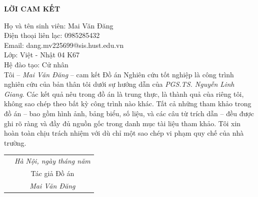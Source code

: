 \documentclass[../DoAn.tex]{subfiles}
\begin{document}
    \hfill
    \begin{center}
        \LARGE\textbf{LỜI CAM KẾT}\\
    \end{center}
    \vspace{1cm}
    Họ và tên sinh viên: Mai Văn Đăng\\ Điện thoại liên lạc: 0985285432\\ Email:
    dang.mv225699@sis.hust.edu.vn\\ Lớp: Việt - Nhật 04 K67\\ Hệ đào tạo: Cử nhân
    \\

    \vspace{1cm}
    Tôi – \emph{Mai Văn Đăng} – cam kết Đồ án Nghiên cứu tốt nghiệp là công trình nghiên cứu của bản thân tôi dưới sự hướng dẫn của \emph{PGS.TS. Nguyễn Linh Giang}. Các kết quả nêu trong đồ án là trung thực, là thành quả của riêng tôi, không sao chép theo bất kỳ công trình nào khác. Tất cả những tham khảo trong đồ án – bao gồm hình ảnh, bảng biểu, số liệu, và các câu từ trích dẫn – đều được ghi rõ ràng và đầy đủ nguồn gốc trong danh mục tài liệu tham khảo. Tôi xin hoàn toàn chịu trách nhiệm với dù chỉ một sao chép vi phạm quy chế của nhà trường.

    \begin{table}[H]
        \centering
        \begin{tabular}{p{5cm} c}
            \multicolumn{1}{c}{\textbf{}} & \emph{Hà Nội, ngày\hspace{0.5cm} tháng\hspace{0.5cm} năm }\vspace{0.4cm} \\
            \textbf{}                     & Tác giả Đồ án \vspace{3cm}                                               \\
            \textbf{}                     & \emph{Mai Văn Đăng}
        \end{tabular}
    \end{table}
\end{document}
